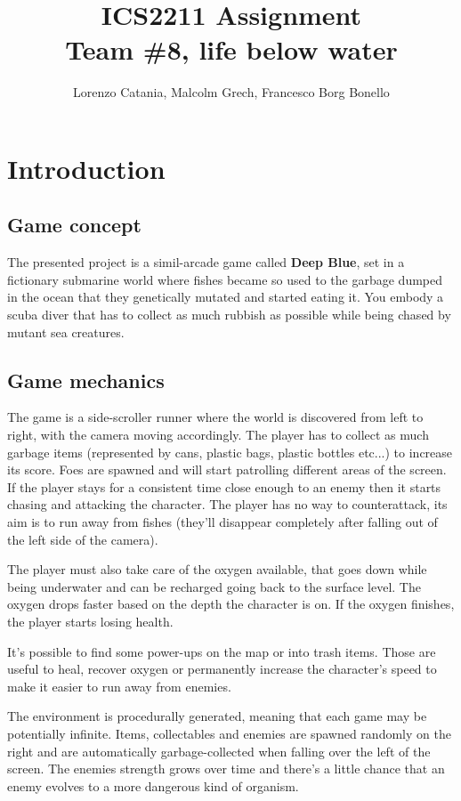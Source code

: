 \documentclass[11pt]{article}
\title{
  ICS2211 Assignment \\
  \large Team \#8, life below water
}
\author{Lorenzo Catania, Malcolm Grech, Francesco Borg Bonello}
\begin{document}
\maketitle

{
  \hypersetup{linkcolor=black}
  \tableofcontents
}

\section{Introduction}
\subsection{Game concept}
The presented project is a simil-arcade game called \textbf{Deep Blue}, set in a fictionary submarine world where fishes became so used to the garbage dumped in the ocean that they genetically mutated and started eating it.
You embody a scuba diver that has to collect as much rubbish as possible while being chased by mutant sea creatures.

\subsection{Game mechanics}
The game is a side-scroller runner where the world is discovered from left to right, with the camera moving accordingly.
The player has to collect as much garbage items (represented by cans, plastic bags, plastic bottles etc...) to increase its score.
Foes are spawned and will start patrolling different areas of the screen. If the player stays for a consistent time close enough to an enemy then it starts chasing and attacking the character. The player has no way to counterattack, its aim is to run away from fishes (they'll disappear completely after falling out of the left side of the camera).

The player must also take care of the oxygen available, that goes down while being underwater and can be recharged going back to the surface level. The oxygen drops faster based on the depth the character is on.
If the oxygen finishes, the player starts losing health.

It's possible to find some power-ups on the map or into trash items.
Those are useful to heal, recover oxygen or permanently increase the character's speed to make it easier to run away from enemies.

The environment is procedurally generated, meaning that each game may be potentially infinite. Items, collectables and enemies are spawned randomly on the right and are automatically garbage-collected when falling over the left of the screen.
The enemies strength grows over time and there's a little chance that an enemy evolves to a more dangerous kind of organism.
\end{document}
